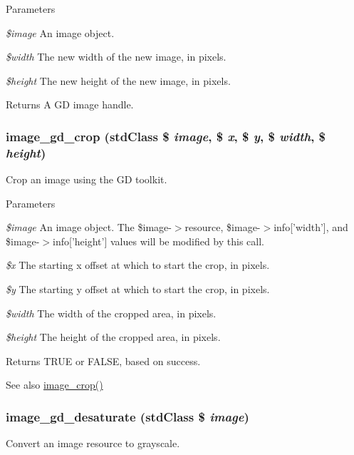 \begin{DoxyParams}{Parameters}
\item[{\em \$image}]An image object. \item[{\em \$width}]The new width of the new image, in pixels. \item[{\em \$height}]The new height of the new image, in pixels. \end{DoxyParams}
\begin{DoxyReturn}{Returns}
A GD image handle. 
\end{DoxyReturn}
\hypertarget{group__image_ga80d6e99f7b538e40dac6b917bfff1bb1}{
\subsubsection[{image\_\-gd\_\-crop}]{\setlength{\rightskip}{0pt plus 5cm}image\_\-gd\_\-crop (stdClass \$ {\em image}, \/  \$ {\em x}, \/  \$ {\em y}, \/  \$ {\em width}, \/  \$ {\em height})}}
\label{group__image_ga80d6e99f7b538e40dac6b917bfff1bb1}
Crop an image using the GD toolkit.


\begin{DoxyParams}{Parameters}
\item[{\em \$image}]An image object. The \$image-\/$>$resource, \$image-\/$>$info\mbox{[}'width'\mbox{]}, and \$image-\/$>$info\mbox{[}'height'\mbox{]} values will be modified by this call. \item[{\em \$x}]The starting x offset at which to start the crop, in pixels. \item[{\em \$y}]The starting y offset at which to start the crop, in pixels. \item[{\em \$width}]The width of the cropped area, in pixels. \item[{\em \$height}]The height of the cropped area, in pixels. \end{DoxyParams}
\begin{DoxyReturn}{Returns}
TRUE or FALSE, based on success.
\end{DoxyReturn}
\begin{DoxySeeAlso}{See also}
\hyperlink{group__image_gaaf7d382a8ec190f746478848ed309fe7}{image\_\-crop()} 
\end{DoxySeeAlso}
\hypertarget{group__image_ga2cb8090035dbb1a1e6a9c82cb52c9789}{
\subsubsection[{image\_\-gd\_\-desaturate}]{\setlength{\rightskip}{0pt plus 5cm}image\_\-gd\_\-desaturate (stdClass \$ {\em image})}}
\label{group__image_ga2cb8090035dbb1a1e6a9c82cb52c9789}
Convert an image resource to grayscale.

